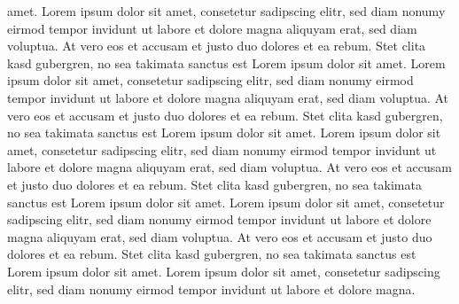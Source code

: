 amet. Lorem ipsum dolor sit amet, consetetur sadipscing elitr, sed diam nonumy eirmod tempor invidunt ut labore et dolore magna aliquyam erat, sed diam voluptua. At vero eos et accusam et justo duo dolores et ea rebum. Stet clita kasd gubergren, no sea takimata sanctus est Lorem ipsum dolor sit amet. Lorem ipsum dolor sit amet, consetetur sadipscing elitr, sed diam nonumy eirmod tempor invidunt ut labore et dolore magna aliquyam erat, sed diam voluptua. At vero eos et accusam et justo duo dolores et ea rebum. Stet clita kasd gubergren, no sea takimata sanctus est Lorem ipsum dolor sit amet. Lorem ipsum dolor sit amet, consetetur sadipscing elitr, sed diam nonumy eirmod tempor invidunt ut labore et dolore magna aliquyam erat, sed diam voluptua. At vero eos et accusam et justo duo dolores et ea rebum. Stet clita kasd gubergren, no sea takimata sanctus est Lorem ipsum dolor sit amet. Lorem ipsum dolor sit amet, consetetur sadipscing elitr, sed diam nonumy eirmod tempor invidunt ut labore et dolore magna aliquyam erat, sed diam voluptua. At vero eos et accusam et justo duo dolores et ea rebum. Stet clita kasd gubergren, no sea takimata sanctus est Lorem ipsum dolor sit amet. Lorem ipsum dolor sit amet, consetetur sadipscing elitr, sed diam nonumy eirmod tempor invidunt ut labore et dolore magna.
